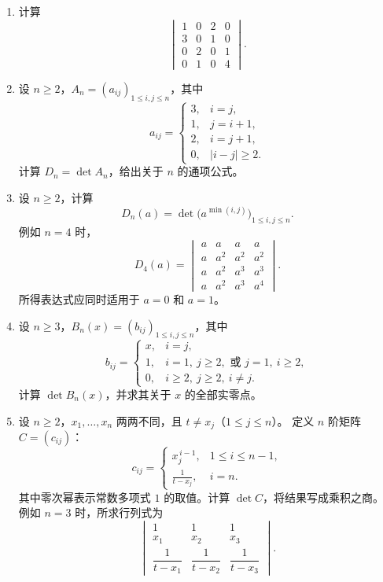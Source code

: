 \documentclass[UTF8,12pt,a4paper,fontset=fandol]{ctexart}
\begin{document}
\begin{enumerate}[label=\arabic*.]
\item\label{q:detcalc-sparse}
计算
\[
\begin{vmatrix}
1&0&2&0\\
3&0&1&0\\
0&2&0&1\\
0&1&0&4
\end{vmatrix}.
\]

\item\label{q:detcalc-tridiagonal}
设 $n\geq2$，$A_n=(a_{ij})_{1\leq i,j\leq n}$，其中
\[
a_{ij}=\begin{cases}
3,&i=j,\\
1,&j=i+1,\\
2,&i=j+1,\\
0,&|i-j|\geq2.
\end{cases}
\]
计算 $D_n=\det A_n$，给出关于 $n$ 的通项公式。

\item\label{q:detcalc-min-powers}
设 $n\geq2$，计算
\[
D_n(a)=\det\bigl(a^{\min(i,j)}\bigr)_{1\leq i,j\leq n}.
\]
例如 $n=4$ 时，
\[
D_4(a)=\begin{vmatrix}
a&a&a&a\\
a&a^2&a^2&a^2\\
a&a^2&a^3&a^3\\
a&a^2&a^3&a^4
\end{vmatrix}.
\]
所得表达式应同时适用于 $a=0$ 和 $a=1$。

\item\label{q:detcalc-arrow}
设 $n\geq3$，$B_n(x)=(b_{ij})_{1\leq i,j\leq n}$，其中
\[
b_{ij}=\begin{cases}
x,&i=j,\\
1,&i=1,\ j\geq2,\text{ 或 }j=1,\ i\geq2,\\
0,&i\geq2,\ j\geq2,\ i\ne j.
\end{cases}
\]
计算 $\det B_n(x)$，并求其关于 $x$ 的全部实零点。

\item\label{q:detcalc-rational-vandermonde}
设 $n\geq2$，$x_1,\ldots,x_n$ 两两不同，且 $t\ne x_j$（$1\leq j\leq n$）。
定义 $n$ 阶矩阵 $C=(c_{ij})$：
\[
c_{ij}=\begin{cases}
x_j^{\,i-1},&1\leq i\leq n-1,\\
\displaystyle\frac{1}{t-x_j},&i=n.
\end{cases}
\]
其中零次幂表示常数多项式 $1$ 的取值。计算 $\det C$，将结果写成乘积之商。
例如 $n=3$ 时，所求行列式为
\[
\begin{vmatrix}
1&1&1\\
x_1&x_2&x_3\\
\dfrac{1}{t-x_1}&\dfrac{1}{t-x_2}&\dfrac{1}{t-x_3}
\end{vmatrix}.
\]

\end{enumerate}
\end{document}
